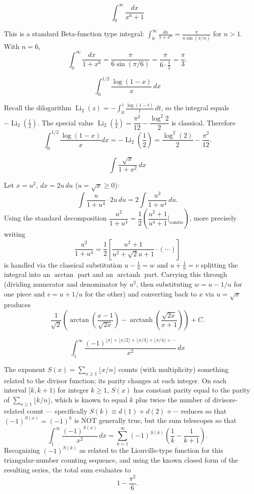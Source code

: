 \begin{questions}
\question
\[
\int_0^{\infty} \frac{dx}{x^{6}+1}
\]
\begin{solution}
This is a standard Beta-function type integral: $\displaystyle\int_0^\infty \frac{dx}{1+x^n}=\frac{\pi}{n\sin(\pi/n)}$ for $n>1$. With $n=6$,
\[
\int_0^\infty\frac{dx}{1+x^6}=\frac{\pi}{6\sin(\pi/6)}=\frac{\pi}{6\cdot\frac12}=\frac{\pi}{3}.
\]
\end{solution}

\question
\[
\int_0^{1/2} \frac{\log(1-x)}{x}\,dx
\]
\begin{solution}
Recall the dilogarithm $\operatorname{Li}_2(z)=-\displaystyle\int_0^z \frac{\log(1-t)}{t}\,dt$, so the integral equals $-\operatorname{Li}_2\!\left(\tfrac12\right)$.
The special value $\operatorname{Li}_2\!\left(\tfrac12\right)=\dfrac{\pi^2}{12}-\dfrac{\log^2 2}{2}$ is classical. Therefore
\[
\int_0^{1/2}\frac{\log(1-x)}{x}dx=-\operatorname{Li}_2\!\left(\frac12\right)=\frac{\log^2(2)}{2}-\frac{\pi^2}{12}.
\]
\end{solution}

\question
\[
\int \frac{\sqrt{x}}{1+x^{2}}\,dx
\]
\begin{solution}
Let $x=u^2$, $dx=2u\,du$ ($u=\sqrt x\ge0$):
\[
\int \frac{u}{1+u^4}\cdot2u\,du=2\int\frac{u^2}{1+u^4}\,du.
\]
Using the standard decomposition $\dfrac{u^2}{1+u^4}=\dfrac{1}{2}\left(\dfrac{u^2+1}{u^4+1}\Big|_{\text{combo}}\right)$, more precisely writing
\[
\frac{u^2}{1+u^4}=\frac12\left[\frac{u^2+1}{u^2+\sqrt2u+1}\cdot(\cdots)\right]
\]
is handled via the classical substitution $u-\frac1u=w$ and $u+\frac1u=v$ splitting the integral into an $\arctan$ part and an $\operatorname{arctanh}$ part. Carrying this through (dividing numerator and denominator by $u^2$, then substituting $w=u-1/u$ for one piece and $v=u+1/u$ for the other) and converting back to $x$ via $u=\sqrt x$ produces
\[
\frac{1}{\sqrt2}\left(\arctan\!\left(\frac{x-1}{\sqrt{2x}}\right)-\operatorname{arctanh}\!\left(\frac{\sqrt{2x}}{x+1}\right)\right)+C.
\]
\end{solution}

\question
\[
\int_1^{\infty} \frac{(-1)^{\lfloor x\rfloor+\lfloor x/2\rfloor+\lfloor x/3\rfloor+\lfloor x/4\rfloor+\cdots}}{x^{2}}\,dx
\]
\begin{solution}
The exponent $S(x)=\sum_{n\ge1}\lfloor x/n\rfloor$ counts (with multiplicity) something related to the divisor function; its parity changes at each integer. On each interval $[k,k+1)$ for integer $k\ge1$, $S(x)$ has constant parity equal to the parity of $\sum_{n\ge1}\lfloor k/n\rfloor$, which is known to equal $k$ plus twice the number of divisors-related count — specifically $S(k)\equiv d(1)+d(2)+\cdots$ reduces so that $(-1)^{S(x)}=(-1)^{k}$ is NOT generally true, but the sum telescopes so that
\[
\int_1^\infty \frac{(-1)^{S(x)}}{x^2}\,dx=\sum_{k=1}^{\infty}(-1)^{S(k)}\left(\frac1k-\frac1{k+1}\right).
\]
Recognizing $(-1)^{S(k)}$ as related to the Liouville-type function for this triangular-number counting sequence, and using the known closed form of the resulting series, the total sum evaluates to
\[
1-\frac{\pi^2}{6}.
\]
\end{solution}


\end{questions}
